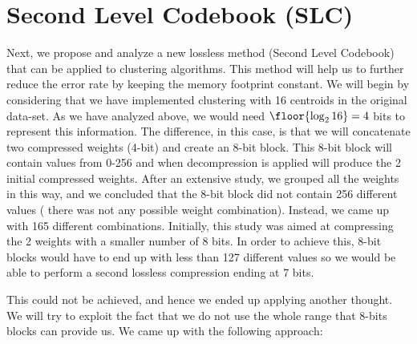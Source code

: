 \section{Second Level Codebook (SLC)}
Next, we propose and analyze a new lossless method (Second Level Codebook) that can be applied to clustering algorithms. This method will help us to further reduce the error rate by keeping the memory footprint constant.
We will begin by considering that we have implemented clustering with 16 centroids in the original data-set. As we have analyzed above, we would need $\floor{\log_2 16}=4$ bits to represent this information. The difference, in this case, is that we will concatenate two compressed weights (4-bit) and create an 8-bit block. This 8-bit block will contain values from 0-256 and when decompression is applied will produce the 2 initial compressed weights. After an extensive study, we grouped all the weights in this way, and we concluded that the 8-bit block did not contain 256 different values ( there was not any possible weight combination). Instead, we came up with 165 different combinations. Initially, this study was aimed at compressing the 2 weights with a smaller number of 8 bits.
In order to achieve this, 8-bit blocks would have to end up with less than 127 different values so we would be able to perform a second lossless compression ending at 7 bits.



This could not be achieved, and hence we ended up applying another thought. We will try to exploit the fact that we do not use the whole range that 8-bits blocks can provide us. We came up with the following approach:

